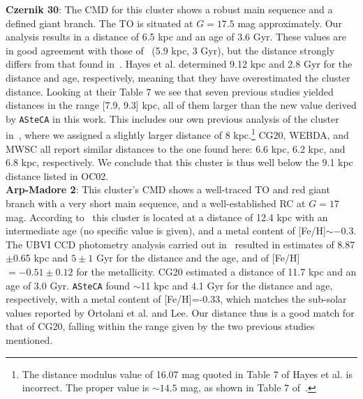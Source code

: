 \documentclass{aa}
\begin{document}
\begin{appendix}
  \noindent \textbf{Czernik 30}: The CMD for this cluster shows a robust main sequence
  and a defined giant branch. The TO is situated at $G=17.5$ mag approximately.
  Our analysis results in a distance of 6.5 kpc and an age of 3.6 Gyr. These
  values are in good agreement with those of~\cite{Dias_2021} (5.9 kpc, 3 Gyr),
  but the distance strongly differs from that found in~\cite{Hayes_2015}.
  Hayes et al. determined 9.12 kpc and 2.8 Gyr for the distance and age,
  respectively, meaning that they have overestimated the cluster distance.
  Looking at their Table 7 we see that seven previous studies yielded distances
  in the range [7.9, 9.3] kpc, all of them larger than the new value derived by
  \texttt{ASteCA} in this work. This includes our own previous analysis of the
  cluster in~\cite{Perren_2015}, where we assigned a slightly larger distance of
  8 kpc.\footnote{The distance modulus value of 16.07 mag quoted in
  Table 7 of Hayes et al. is incorrect. The proper value is $\sim14.5$ mag, as
  shown in Table 7 of~\cite{Perren_2015}.}
  CG20, WEBDA, and MWSC all report similar distances to the one found here:
  6.6 kpc, 6.2 kpc, and 6.8 kpc, respectively. We conclude that this cluster
  is thus well below the 9.1 kpc distance listed in OC02.\\

  \noindent \textbf{Arp-Madore 2}: This cluster's CMD shows a well-traced TO and
  red giant branch with a very short main sequence, and a
  well-established RC at $G=17$ mag.
  According to~\cite{Ortolani_1995} this cluster is located at a distance of
  12.4 kpc with an intermediate age (no specific value is given), and a metal
  content of [Fe/H]$\sim-0.3$.
  The UBVI CCD photometry analysis carried out in~\cite{Lee_1997} resulted in
  estimates of 8.87$\pm$0.65 kpc and $5\pm1$ Gyr for the distance and the age,
  and of [Fe/H]$=-0.51\pm0.12$ for the metallicity.
  CG20 estimated a distance of 11.7 kpc and an age of 3.0 Gyr.
  \texttt{ASteCA} found $\sim$11 kpc and 4.1 Gyr for the distance and
  age, respectively, with a metal content of [Fe/H]=-0.33, which matches the
  sub-solar values reported by Ortolani et al. and Lee.
  Our distance thus is a good match for that of CG20, falling within the range
  given by the two previous studies mentioned.\\


\end{appendix}
\end{document}
